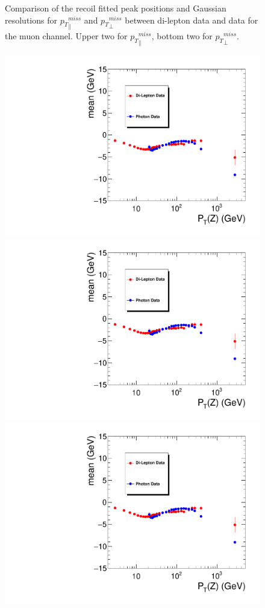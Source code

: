 \begin{figure}[htbp]
\begin{center}
\caption{Comparison of the recoil fitted peak positions and Gaussian resolutions for ${p_{T}}^{miss}_\parallel$ and ${p_{T}}^{miss}_\perp$ between di-lepton data and \gjets data for the muon channel. Upper two for 
${p_{T}}^{miss}_\parallel$, bottom two for ${p_{T}}^{miss}_\perp$.}
\label{fig:recoilfit_met_peak_reso_compare_data_gjets_mu}
\end{center}
\end{figure}

\begin{figure}[htbp]
\begin{center}
\includegraphics[width=0.46\linewidth, page=1]{figures/plots_SingleEMU_Run2016Full_03Feb2017_allcorV2_met_para_study_ZSelecLowLPt_el_VS_SinglePhoton_Run2016Full_03Feb2017_allcorV2_NoRecoil_met_para_study_ZSelecLowLPt_el.pdf}
\includegraphics[width=0.46\linewidth, page=5]{figures/plots_SingleEMU_Run2016Full_03Feb2017_allcorV2_met_para_study_ZSelecLowLPt_el_VS_SinglePhoton_Run2016Full_03Feb2017_allcorV2_NoRecoil_met_para_study_ZSelecLowLPt_el.pdf}
\includegraphics[width=0.46\linewidth, page=3]{figures/plots_SingleEMU_Run2016Full_03Feb2017_allcorV2_met_para_study_ZSelecLowLPt_el_VS_SinglePhoton_Run2016Full_03Feb2017_allcorV2_NoRecoil_met_para_study_ZSelecLowLPt_el.pdf}

\end{center}
\end{figure}

